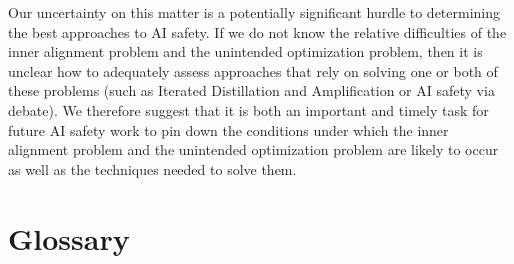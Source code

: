 \documentclass[
  onecolumn,
  natbib,
]{miri-tech-article}
\begin{document}
Our uncertainty on this matter is a potentially significant hurdle to determining the best approaches to AI safety. If we do not know the relative difficulties of the inner alignment problem and the unintended optimization problem, then it is unclear how to adequately assess approaches that rely on solving one or both of these problems (such as Iterated Distillation and Amplification\cite{amplification} or AI safety via debate\cite{debate}). We therefore suggest that it is both an important and timely task for future AI safety work to pin down the conditions under which the inner alignment problem and the unintended optimization problem are likely to occur as well as the techniques needed to solve them.

\section{Glossary}
\end{document}
